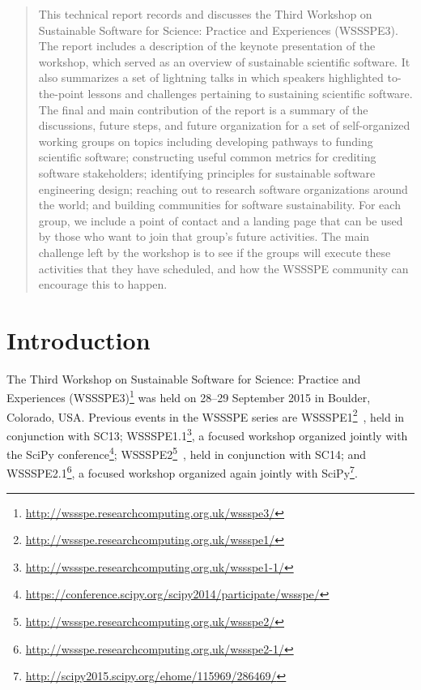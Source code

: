 \documentclass[11pt, oneside]{amsart}
\begin{document}
\begin{abstract}
This technical report records and discusses the Third Workshop on Sustainable
Software for Science: Practice and Experiences (WSSSPE3). The report includes a
description of the keynote presentation of the workshop, which served as an overview of sustainable
scientific software. It also summarizes a set of lightning
talks in which speakers highlighted to-the-point lessons and challenges
pertaining to sustaining scientific software. The final and main contribution of the report is a summary of the
discussions, future steps, and future organization for a set of self-organized
working groups on topics including developing pathways to funding scientific
software; constructing useful common metrics for crediting software
stakeholders; identifying principles for sustainable software engineering
design; reaching out to research software organizations around the world; and
building communities for software sustainability. For each group, we include a
point of contact and a landing page that can be used by those who want to join
that group's future activities. The main challenge left by the workshop is to
see if the groups will execute these activities that they have scheduled, and
how the WSSSPE community can encourage this to happen.

\end{abstract}



\maketitle
\newpage

\section{Introduction} \label{sec:intro}

The Third Workshop on Sustainable Software for Science: Practice and Experiences
(WSSSPE3)\footnote{\url{http://wssspe.researchcomputing.org.uk/wssspe3/}} was
held on 28--29 September 2015 in Boulder, Colorado, USA. Previous events in the
WSSSPE series are
WSSSPE1\footnote{\url{http://wssspe.researchcomputing.org.uk/wssspe1/}}~\cite{WSSSPE1-pre-report,WSSSPE1},
held in conjunction with SC13;
WSSSPE1.1\footnote{\url{http://wssspe.researchcomputing.org.uk/wssspe1-1/}}, a
focused workshop organized jointly with the SciPy
conference\footnote{\url{https://conference.scipy.org/scipy2014/participate/wssspe/}};
WSSSPE2\footnote{\url{http://wssspe.researchcomputing.org.uk/wssspe2/}}~\cite{WSSSPE2-pre-report,WSSSPE2},
held in conjunction with SC14; and
WSSSPE2.1\footnote{\url{http://wssspe.researchcomputing.org.uk/wssspe2-1/}}, a
focused workshop organized again jointly with
SciPy\footnote{\url{http://scipy2015.scipy.org/ehome/115969/286469/}}.
\end{document}
